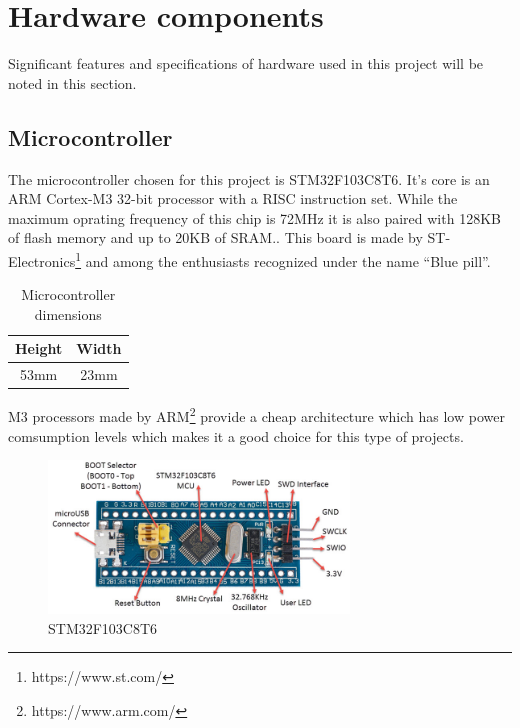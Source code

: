 \section{Hardware components}

Significant features and specifications of hardware used in this project will be noted in this section.

\subsection{Microcontroller}
The microcontroller chosen for this project is STM32F103C8T6. 
It's core is an ARM Cortex-M3 32-bit processor with a RISC instruction set. 
While the maximum oprating frequency of this chip is 72MHz it is also paired with 128KB of flash memory and up to 20KB of SRAM.\cite{STMDS}. 
This board is made by ST-Electronics\footnote{https://www.st.com/} and among the enthusiasts recognized under the name ``Blue pill''.

\begin{table}[htbp]
    \caption{Microcontroller dimensions}
    \begin{center}
        \begin{tabular}{|c|c|}
            \hline
            \textbf{Height} & \textbf{Width}\\
            \hline
            53mm & 23mm\\
            \hline
        \end{tabular}
        \label{tab1}
    \end{center}
\end{table}

M3 processors made by ARM\footnote{https://www.arm.com/} provide a cheap architecture which has low power comsumption levels which makes it a good choice for this type of projects.

\begin{figure}[htbp]
    \centerline{\includegraphics[width=8cm]{Images/STM32F103C8T6.jpg}}
    \caption{STM32F103C8T6}
    \label{fig1}
\end{figure}


